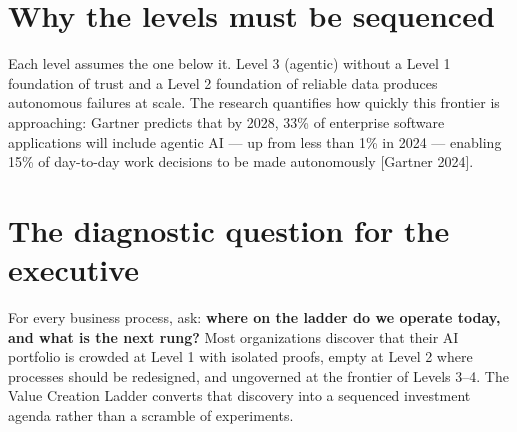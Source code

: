 \vspace{0.6em}
\begin{center}
\end{center}

\section{Why the levels must be sequenced}

Each level assumes the one below it. Level 3 (agentic) without a Level 1
foundation of trust and a Level 2 foundation of reliable data produces
autonomous failures at scale. The research quantifies how quickly this frontier
is approaching: Gartner predicts that by 2028, 33\% of enterprise software
applications will include agentic AI — up from less than 1\% in 2024 —
enabling 15\% of day-to-day work decisions to be made autonomously
[Gartner 2024].

\section{The diagnostic question for the executive}

For every business process, ask: \textbf{where on the ladder do we operate
today, and what is the next rung?} Most organizations discover that their AI
portfolio is crowded at Level 1 with isolated proofs, empty at Level 2 where
processes should be redesigned, and ungoverned at the frontier of Levels 3--4.
The Value Creation Ladder converts that discovery into a sequenced investment
agenda rather than a scramble of experiments.

